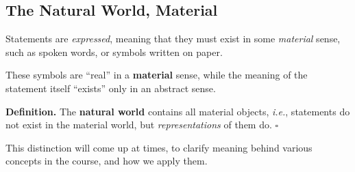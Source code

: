 \documentclass[letterpaper,twoside]{article}
\def\SmallHSpace{\hspace*{1mm}}
\newcommand{\Eg}[1]{\textit{e.g.}, #1}
\newcommand\Ie[1]{\textit{i.e.}, #1}
\newcommand{\DefinedTerm}[1]{\textbf{#1}}
\newcommand{\Definition}[1]{%
    \emoji{book} \textbf{Definition.}\SmallHSpace #1 \hfill $\square$
}
\begin{document}
\begin{multicols}{2}






\subsection{The Natural World, Material}

Statements are \textit{expressed}, meaning that they must exist in some \textit{material} sense, such as spoken words, or symbols written on paper.

These symbols are ``real'' in a \textbf{material} sense, while the meaning of the statement itself ``exists'' only in an abstract sense.

\Definition
{
    The \DefinedTerm{natural world} contains all material objects, \textit{i.e.}, statements do not exist in the material world, but \textit{representations} of them do.
}

This distinction will come up at times, to clarify meaning behind various concepts in the course, and how we apply them.





\end{multicols}
\end{document}
